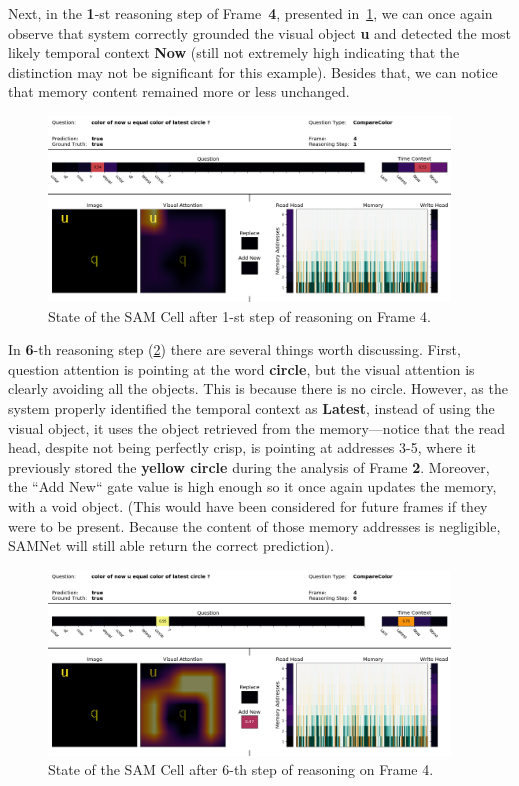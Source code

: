 Next, in the \textbf{1}-st reasoning step of Frame~\textbf{4}, presented in~\cref{fig:frame-4-step-1}, 
we can once again observe that  system correctly grounded the visual object \textbf{u} and detected the most likely temporal context \textbf{Now} (still not extremely high indicating that the distinction may not be significant for this example).
Besides that, we can notice that memory content remained more or less unchanged.
\begin{figure}[!h]
	\centering
	\includegraphics[width=0.95\textwidth]{"../img/visualization/experiment_run_20190917_022319/Frame 4 Step 1"}
	\caption{State of the SAM Cell after 1-st step of reasoning on Frame 4.} 
	\label{fig:frame-4-step-1}
\end{figure}


In \textbf{6}-th reasoning step (\cref{fig:frame-4-step-6}) there are several things worth discussing.
First, question attention is pointing at the word \textbf{circle}, but the visual attention is clearly avoiding all the objects. 
This is because there is no circle.
However, as the system properly identified the temporal context as \textbf{Latest}, instead of using the visual object, it uses the object retrieved from the memory---notice that the read head, despite not being perfectly crisp, is pointing at addresses 3-5, where it previously stored the \textbf{yellow circle} during the analysis of Frame \textbf{2}.
Moreover, the ``Add New`` gate value is high enough so it once again updates the memory, with a void object. 
(This would have been considered for future frames if they were to be present. 
Because the content of those memory addresses is negligible, SAMNet  will still able return the correct prediction).

\begin{figure}[!h]
	\centering
	\includegraphics[width=0.95\textwidth]{"../img/visualization/experiment_run_20190917_022319/Frame 4 Step 6"}
	\caption{State of the SAM Cell after 6-th step of reasoning on Frame 4.} 
	\label{fig:frame-4-step-6}
\end{figure}
